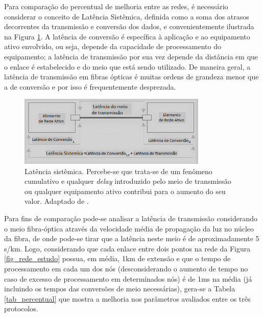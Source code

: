 \documentclass[12pt]{article}
\begin{document}

Para comparação do percentual de melhoria entre as redes, é necessário considerar o conceito de Latência Sistêmica, definida como a soma dos atrasos decorrentes da transmissão e conversão dos dados, e convenientemente ilustrada na Figura \ref{fig_latencia_sistemica}. A latência de conversão é específica à aplicação e ao equipamento ativo envolvido, ou seja, depende da capacidade de processamento do equipamento; a latência de transmissão por sua vez depende da distância em que o enlace é estabelecido e do meio que está sendo utilizado. De maneira geral, a latência de transmissão em fibras ópticas é muitas ordens de grandeza menor que a de conversão e por isso é frequentemente desprezada.

\begin{figure}[ht] %
	\centering
	\includegraphics[width=9cm]{latency_systemic_PB}
	\caption{Latência sistêmica. Percebe-se que trata-se de um fenômeno cumulativo e qualquer \emph{delay} introduzido pelo meio de transmissão ou qualquer equipamento ativo contribui para o aumento do seu valor. Adaptado de \cite{Art_Coffey}.}
	\label{fig_latencia_sistemica}
\end{figure}

Para fins de comparação pode-se analisar a latência de transmissão considerando o meio fibra-óptica através da velocidade média de propagação da luz no núcleo da fibra, de onde pode-se tirar que a latência neste meio é de aproximadamente 5 \textmu s/km. Logo, considerando que cada enlace entre dois pontos na rede da Figura \ref{fig_rede_estudo} possua, em média, 1km de extensão e que o tempo de processamento em cada um dos nós (desconsiderando o aumento de tempo no caso de excesso de processamento em determinados nós) é de 1ms na média (já incluindo os tempos das conversões de meio necessárias), gera-se a Tabela \ref{tab_percentual} que mostra a melhoria nos parâmetros avaliados entre os três protocolos.
\end{document}
